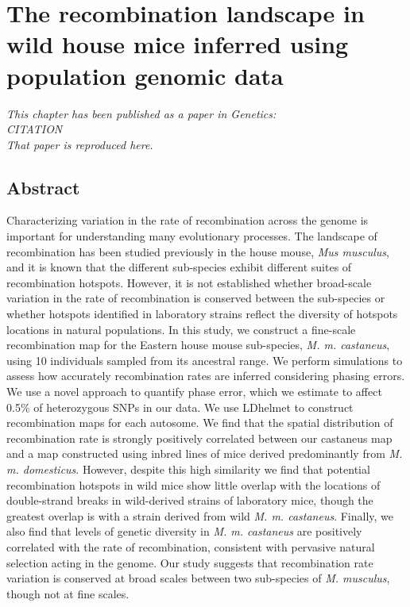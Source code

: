 \chapter{The recombination landscape in wild house mice inferred using population genomic data}

\emph{This chapter has been published as a paper in Genetics: \\CITATION\\That paper is reproduced here.}
\section{Abstract}
 
Characterizing variation in the rate of recombination across the genome is important for understanding many evolutionary processes. The landscape of recombination has been studied previously in the house mouse, \emph{Mus musculus}, and it is known that the different sub-species exhibit different suites of recombination hotspots. However, it is not established whether broad-scale variation in the rate of recombination is conserved between the sub-species or whether hotspots identified in laboratory strains reflect the diversity of hotspots locations in natural populations. In this study, we construct a fine-scale recombination map for the Eastern house mouse sub-species, \emph{M. m. castaneus}, using 10 individuals sampled from its ancestral range. We perform simulations to assess how accurately recombination rates are inferred considering phasing errors. We use a novel approach to quantify phase error, which we estimate to affect 0.5\% of heterozygous SNPs in our data. We use LDhelmet to construct recombination maps for each autosome. We find that the spatial distribution of recombination rate is strongly positively correlated between our castaneus map and a map constructed using inbred lines of mice derived predominantly from \emph{M. m. domesticus}. However, despite this high similarity we find that potential recombination hotspots in wild mice show little overlap with the locations of double-strand breaks in wild-derived strains of laboratory mice, though the greatest overlap is with a strain derived from wild \emph{M. m. castaneus}. Finally, we also find that levels of genetic diversity in \emph{M. m. castaneus} are positively correlated with the rate of recombination, consistent with pervasive natural selection acting in the genome. Our study suggests that recombination rate variation is conserved at broad scales between two sub-species of \emph{M. musculus}, though not at fine scales.

